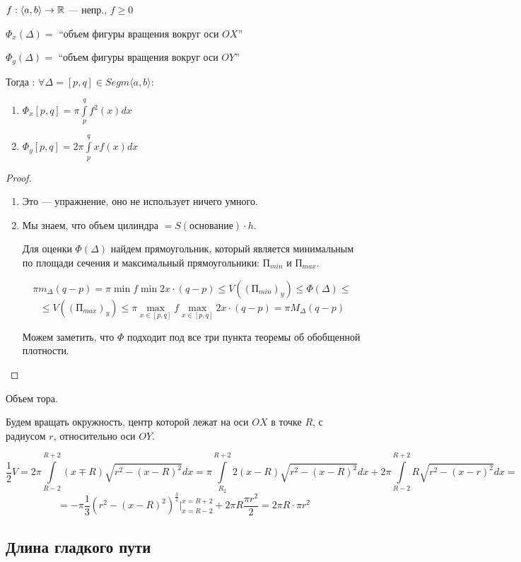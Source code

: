 \begin{theorem}
    $f:\langle a,b\rangle\to\mathbb{R}$ --- непр., $f\geq 0$

    $\Phi_x(\Delta)=$ ``объем фигуры вращения вокруг оси $OX$''

    $\Phi_y(\Delta)=$ ``объем фигуры вращения вокруг оси $OY$''

    Тогда : $\forall \Delta = [p,q]\in Segm\langle a,b\rangle:$
    \begin{enumerate}
        \item $\Phi_x[p,q]=\pi\int\limits_p^q f^2(x)dx$
        \item $\Phi_y[p,q]=2\pi\int\limits_p^q xf(x)dx$
    \end{enumerate}
\end{theorem}
\begin{proof}
    \begin{enumerate}
        \item Это --- упражнение, оно не использует ничего умного.
        \item Мы знаем, что объем цилиндра $=S(\text{основание})\cdot h$.
        
        Для оценки $\Phi(\Delta)$ найдем прямоугольник, который является минимальным по площади сечения и максимальный прямоугольники: $\text{П}_{min}$ и $\text{П}_{max}$.

        $$\pi m_\Delta(q-p)=\pi\min f\min 2x \cdot (q-p)\leq V((\text{П}_{min})_y)\leq \Phi(\Delta)\leq$$
        $$\leq V((\text{П}_{max})_y)\leq \pi\max\limits_{x\in[p,q]}f \max\limits_{x\in[p,q]} 2x\cdot (q-p)=\pi M_\Delta(q-p)$$

        Можем заметить, что $\Phi$ подходит под все три пункта теоремы об обобщенной плотности.
    \end{enumerate}
\end{proof}

\begin{example}
    Объем тора.

    Будем вращать окружность, центр которой лежат на оси $OX$ в точке $R$, с радиусом $r$, относительно оси $OY$.

    $$\frac{1}{2}V=2\pi \int\limits_{R-2}^{R+2}(x\mp R)\sqrt{r^2-(x-R)^2}dx=\pi\int\limits_{R_2}^{R+2} 2(x-R)\sqrt{r^2-(x-R)^2}dx+2\pi\int\limits_{R-2}^{R+2} R\sqrt{r^2-(x-r)^2}dx=$$
    $$=-\pi\frac{1}{3}(r^2-(x-R)^2)^{\frac{3}{2}}|_{x=R-2}^{x=R+2}+2\pi R\frac{\pi r^2}{2}=2\pi R\cdot \pi r^2$$
\end{example}

\subsection*{Длина гладкого пути}

